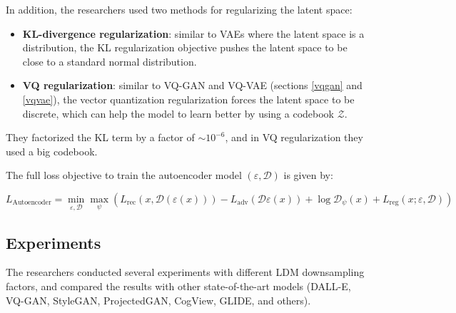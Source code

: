 In addition, the researchers used two methods for regularizing the latent space:

\begin{itemize}
    \item \textbf{KL-divergence regularization}: similar to VAEs where the latent space is a distribution, the KL regularization objective pushes the latent space to be close to a standard normal distribution.
    \item \textbf{VQ regularization}: similar to VQ-GAN and VQ-VAE (sections \ref{vqgan} and \ref{vqvae}), the vector quantization regularization forces the latent space to be discrete, which can help the model to learn better by using a codebook $\mathcal{Z}$.
\end{itemize}

They factorized the KL term by a factor of $\sim 10^{-6}$, and in VQ regularization they used a big codebook.

The full loss objective to train the autoencoder model $(\varepsilon, \mathcal{D})$ is given by:

\begin{equation*}
    L_{\text{Autoencoder}} = \min_{\varepsilon, \mathcal{D}} \max_{\psi} \left( L_{\text{rec}} (x, \mathcal{D} (\varepsilon (x))) - L_{\text{adv}} (\mathcal{D} \varepsilon (x)) + \log \mathcal{D}_\psi (x) + L_{\text{reg}} (x; \varepsilon, \mathcal{D}) \right)
\end{equation*}


















\subsection{Experiments}

The researchers conducted several experiments with different LDM downsampling factors, and compared the results with other state-of-the-art models (DALL-E, VQ-GAN, StyleGAN, ProjectedGAN, CogView, GLIDE, and others).

